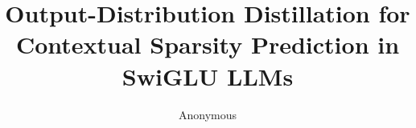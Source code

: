 \documentclass[11pt]{article}
\title{Output-Distribution Distillation for Contextual Sparsity Prediction in SwiGLU LLMs}
\author{Anonymous}
\begin{document}
\maketitle

\begin{abstract}

\end{abstract}











\end{document}

